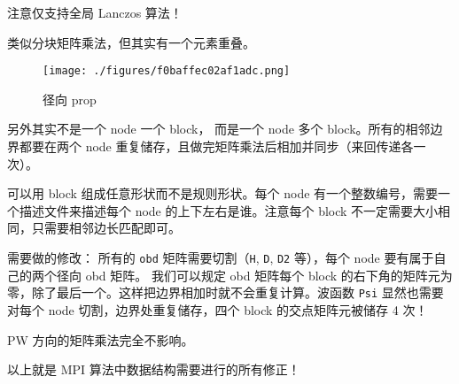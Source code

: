 
注意仅支持全局 Lanczos 算法！

类似分块矩阵乘法，但其实有一个元素重叠。
\begin{figure}[ht]
\centering
\texttt{[image: ./figures/f0baffec02af1adc.png]}
\caption{径向 prop} \label{fig_HeMPI_1}
\end{figure}
另外其实不是一个 node 一个 block， 而是一个 node 多个 block。所有的相邻边界都要在两个 node 重复储存，且做完矩阵乘法后相加并同步（来回传递各一次）。

可以用 block 组成任意形状而不是规则形状。每个 node 有一个整数编号，需要一个描述文件来描述每个 node 的上下左右是谁。注意每个 block 不一定需要大小相同，只需要相邻边长匹配即可。

需要做的修改： 所有的 \verb`obd` 矩阵需要切割（\verb`H`, \verb`D`, \verb`D2` 等），每个 node 要有属于自己的两个径向 obd 矩阵。 我们可以规定 obd 矩阵每个 block 的右下角的矩阵元为零，除了最后一个。这样把边界相加时就不会重复计算。波函数 \verb`Psi` 显然也需要对每个 node 切割，边界处重复储存，四个 block 的交点矩阵元被储存 4 次！

PW 方向的矩阵乘法完全不影响。

以上就是 MPI 算法中数据结构需要进行的所有修正！
